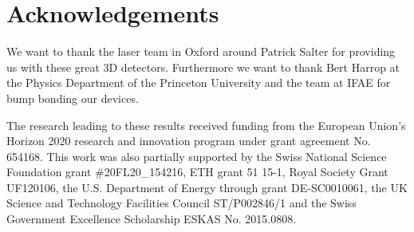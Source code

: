 \section*{Acknowledgements} 
We want to thank the laser team in Oxford around Patrick Salter for providing us with these great 3D detectors. Furthermore we want to thank Bert Harrop at the Physics Department of the Princeton University and the team at IFAE for bump bonding our devices.\par
The research leading to these results received funding from the European Union's Horizon 2020 research and innovation program under grant agreement No. 654168. This work was also partially supported by the Swiss National Science Foundation grant \#20FL20\_154216, ETH grant 51 15-1, Royal Society Grant UF120106, the U.S. Department of Energy through grant DE-SC0010061, the UK Science and Technology Facilities Council ST/P002846/1 and the  Swiss Government Excellence Scholarship ESKAS No. 2015.0808.
